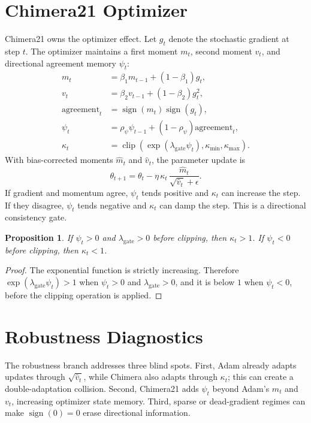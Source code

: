 \documentclass[11pt]{article}
\newtheorem{proposition}{Proposition}
\newcommand{\sgn}{\operatorname{sign}}
\newcommand{\clip}{\operatorname{clip}}
\begin{document}
\section{Chimera21 Optimizer}

Chimera21 owns the optimizer effect. Let $g_t$ denote the stochastic gradient at step $t$. The optimizer maintains a first moment $m_t$, second moment $v_t$, and directional agreement memory $\psi_t$:
\begin{align}
m_t &= \beta_1 m_{t-1} + (1-\beta_1)g_t,\\
v_t &= \beta_2 v_{t-1} + (1-\beta_2)g_t^2,\\
\mathrm{agreement}_t &= \sgn(m_t)\sgn(g_t),\\
\psi_t &= \rho_\psi \psi_{t-1} + (1-\rho_\psi)\mathrm{agreement}_t,\\
\kappa_t &= \clip\left(\exp(\lambda_{\mathrm{gate}}\psi_t),\kappa_{\min},\kappa_{\max}\right).
\end{align}
With bias-corrected moments $\hat m_t$ and $\hat v_t$, the parameter update is
\[
\theta_{t+1}
=\theta_t-\eta\,\kappa_t\,\frac{\hat m_t}{\sqrt{\hat v_t}+\epsilon}.
\]
If gradient and momentum agree, $\psi_t$ tends positive and $\kappa_t$ can increase the step. If they disagree, $\psi_t$ tends negative and $\kappa_t$ can damp the step. This is a directional consistency gate.

\begin{proposition}
If $\psi_t>0$ and $\lambda_{\mathrm{gate}}>0$ before clipping, then $\kappa_t>1$. If $\psi_t<0$ before clipping, then $\kappa_t<1$.
\end{proposition}

\begin{proof}
The exponential function is strictly increasing. Therefore $\exp(\lambda_{\mathrm{gate}}\psi_t)>1$ when $\psi_t>0$ and $\lambda_{\mathrm{gate}}>0$, and it is below $1$ when $\psi_t<0$, before the clipping operation is applied.
\end{proof}

\section{Robustness Diagnostics}

The robustness branch addresses three blind spots. First, Adam already adapts updates through $\sqrt{\hat v_t}$, while Chimera also adapts through $\kappa_t$; this can create a double-adaptation collision. Second, Chimera21 adds $\psi_t$ beyond Adam's $m_t$ and $v_t$, increasing optimizer state memory. Third, sparse or dead-gradient regimes can make $\sgn(0)=0$ erase directional information.
\end{document}
